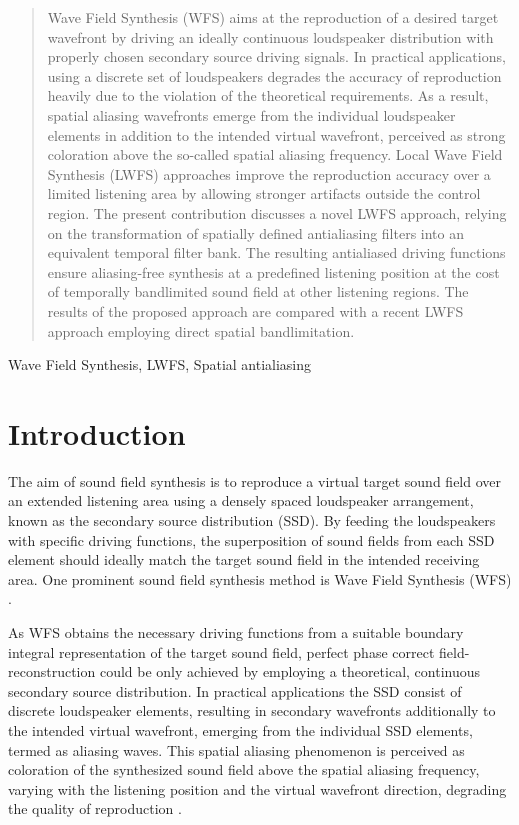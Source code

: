 \documentclass[conference]{IEEEtran}
\begin{document}
\begin{abstract}
    Wave Field Synthesis (WFS) aims at the reproduction of a desired target wavefront by driving an ideally continuous loudspeaker distribution with properly chosen secondary source driving signals.
    In practical applications, using a discrete set of loudspeakers degrades the accuracy of reproduction heavily due to the violation of the theoretical requirements.
    As a result, spatial aliasing wavefronts emerge from the individual loudspeaker elements in addition to the intended virtual wavefront, perceived as strong coloration above the so-called spatial aliasing frequency.
    Local Wave Field Synthesis (LWFS) approaches improve the reproduction accuracy over a limited listening area by allowing stronger artifacts outside the control region.
    The present contribution discusses a novel LWFS approach, relying on the transformation of spatially defined antialiasing filters into an equivalent temporal filter bank.
    The resulting antialiased driving functions ensure aliasing-free synthesis at a predefined listening position at the cost of temporally bandlimited sound field at other listening regions.
    The results of the proposed approach are compared with a recent LWFS approach employing direct spatial bandlimitation.
\end{abstract}

\begin{IEEEkeywords}
    Wave Field Synthesis, LWFS, Spatial antialiasing
\end{IEEEkeywords}

\section{Introduction}
\label{sec:introduction}
The aim of sound field synthesis is to reproduce a virtual target sound field over an extended listening area using a densely spaced loudspeaker arrangement, known as the secondary source distribution (SSD).
By feeding the loudspeakers with specific driving functions, the superposition of sound fields from each SSD element should ideally match the target sound field in the intended receiving area.
One prominent sound field synthesis method is Wave Field Synthesis (WFS) \cite{Berkhout1993:Acoustic_control_by_WFS, Start1997:phd}. 

As WFS obtains the necessary driving functions from a suitable boundary integral representation of the target sound field, perfect phase correct field-reconstruction could be only achieved by employing a theoretical, continuous secondary source distribution.
In practical applications the SSD consist of discrete loudspeaker elements, resulting in secondary wavefronts additionally to the intended virtual wavefront, emerging from the individual SSD elements, termed as aliasing waves.
This spatial aliasing phenomenon is perceived as coloration of the synthesized sound field above the spatial aliasing frequency, varying with the listening position and the virtual wavefront direction, degrading the quality of reproduction \cite{8371275, 8611109}.
\end{document}
